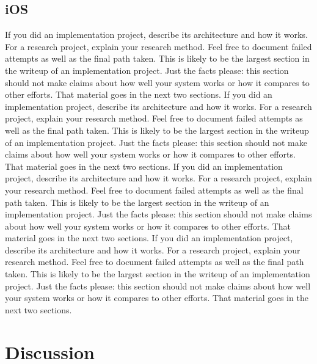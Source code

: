 \documentclass{acm_proc_article-sp}
\begin{document}
\subsection{iOS}
If you did an implementation project, describe its architecture and how it works. For a research project, explain your research method. Feel free to document failed attempts as well as the final path taken. This is likely to be the largest section in the writeup of an implementation project. Just the facts please: this section should not make claims about how well your system works or how it compares to other efforts. That material goes in the next two sections. If you did an implementation project, describe its architecture and how it works. For a research project, explain your research method. Feel free to document failed attempts as well as the final path taken. This is likely to be the largest section in the writeup of an implementation project. Just the facts please: this section should not make claims about how well your system works or how it compares to other efforts. That material goes in the next two sections. If you did an implementation project, describe its architecture and how it works. For a research project, explain your research method. Feel free to document failed attempts as well as the final path taken. This is likely to be the largest section in the writeup of an implementation project. Just the facts please: this section should not make claims about how well your system works or how it compares to other efforts. That material goes in the next two sections. If you did an implementation project, describe its architecture and how it works. For a research project, explain your research method. Feel free to document failed attempts as well as the final path taken. This is likely to be the largest section in the writeup of an implementation project. Just the facts please: this section should not make claims about how well your system works or how it compares to other efforts. That material goes in the next two sections.


\section{Discussion}
\end{document}
